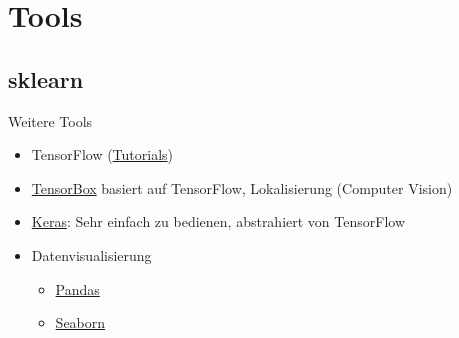 \documentclass{beamer}
\begin{document}
\section{Tools}
\subsection{sklearn}
\begin{frame}{Weitere Tools}
    \begin{itemize}
        \item TensorFlow (\href{https://www.tensorflow.org/versions/r0.8/tutorials/index.html}{Tutorials})
        \item \href{https://github.com/Russell91/TensorBox}{TensorBox} basiert auf TensorFlow, Lokalisierung (Computer Vision)
        \item \href{http://keras.io/}{Keras}: Sehr einfach zu bedienen,
              abstrahiert von TensorFlow
        \item Datenvisualisierung
            \begin{itemize}
                \item \href{http://pandas.pydata.org/}{Pandas}
                \item \href{https://web.stanford.edu/~mwaskom/software/seaborn/}{Seaborn}
            \end{itemize}
    \end{itemize}
\end{frame}
\end{document}
